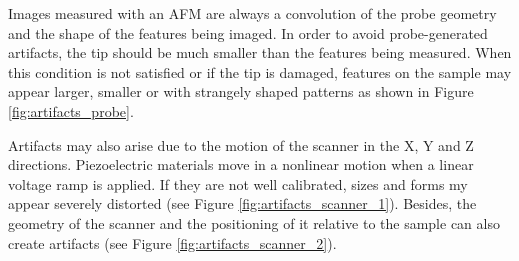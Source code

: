 \documentclass[11pt,a4paper]{article}
\begin{document}
Images measured with an AFM are always a convolution of the probe geometry and the shape of the features being imaged. In order to avoid probe-generated artifacts, the tip should be much smaller than the features being measured. When this condition is not satisfied or if the tip is damaged, features on the sample may appear larger, smaller or with strangely shaped patterns as shown in Figure \ref{fig:artifacts_probe}.

Artifacts may also arise due to the motion of the scanner in the X, Y and Z directions. Piezoelectric materials move in a nonlinear motion when a linear voltage ramp is applied. If they are not well calibrated, sizes and forms my appear severely distorted (see Figure \ref{fig:artifacts_scanner_1}). Besides, the geometry of the scanner and the positioning of it relative to the sample can also create artifacts (see Figure \ref{fig:artifacts_scanner_2}).
\end{document}
